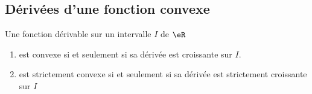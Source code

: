 \subsection{Dérivées d'une fonction convexe}

\begin{proposition} \label{PropYKwTDPX}
	Une fonction dérivable sur un intervalle \( I\) de \( \eR\)
	\begin{enumerate}
		\item       \label{ITEMooUTSAooJvhZNm}
		      est convexe si et seulement si sa dérivée est croissante sur \( I\).
		\item       \label{ITEMooLLSIooFwkxtV}
		      est strictement convexe si et seulement si sa dérivée est strictement croissante sur \( I\)
	\end{enumerate}
\end{proposition}

